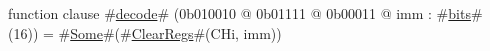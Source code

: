 function clause #\hyperref[zdecode]{decode}# (0b010010 @ 0b01111 @ 0b00011 @ imm : #\hyperref[zbits]{bits}#(16)) = #\hyperref[zSome]{Some}#(#\hyperref[zClearRegs]{ClearRegs}#(CHi,  imm))
